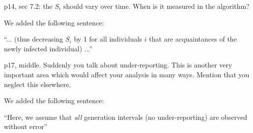 \documentclass[12pt]{article}
\newcommand{\revtext}{\textsf}
\begin{document}
\revtext{p14, sec 7.2: the $S_i$ should vary over time. When is it measured in the algorithm?}

We added the following sentence:

``... (thus decreasing $S_i$ by 1 for all individuals $i$ that are acquaintances of the newly infected individual) ...''

\revtext{p17, middle. Suddenly you talk about under-reporting. This is another very important area which would affect your analysis in many ways. Mention that you neglect this elsewhere.
}

We added the following sentence:

``Here, we assume that \emph{all} generation intervals (no under-reporting) are observed without error''
\end{document}
